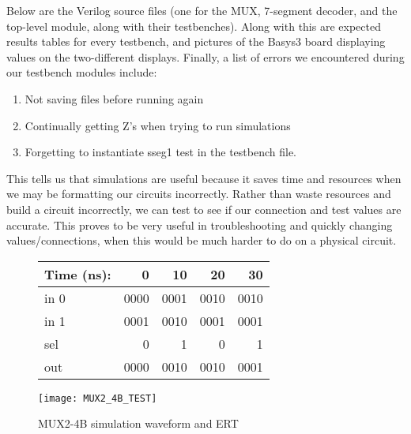 \documentclass[11pt]{article}
\begin{document}
Below are the Verilog source files (one for the MUX, 7-segment decoder, and the top-level module, along with their testbenches). Along with this are expected results tables for every testbench, and pictures of the Basys3 board displaying values on the two-different displays. Finally, a list of errors we encountered during our testbench modules include:

\begin{enumerate}
	
	\item Not saving files before running again
	
	
	
	\item Continually getting Z's when trying to run simulations
	
	
	
	\item Forgetting to instantiate sseg1 test in the testbench file.
	
	
	
\end{enumerate} 

This tells us that simulations are useful because it saves time and resources when we may be formatting our circuits incorrectly. Rather than waste resources and build a circuit incorrectly, we can test to see if our connection and test values are accurate. This proves to be very useful in troubleshooting and quickly changing values/connections, when this would be much harder to do on a physical circuit.



\begin{figure}[ht]\centering
	\begin{tabular}{l|rrrr}
		Time (ns): & 0 & 10 & 20 & 30 \\
		\midrule 
		in 0 & 0000 & 0001 & 0010 & 0010 \\
		in 1 & 0001 & 0010 & 0001 & 0001 \\
		sel & 0 & 1 & 0 & 1 \\
		\bottomrule
		out & 0000 & 0010 &0010 &0001 
	\end{tabular}\medskip
	
	\texttt{[image: MUX2\_4B\_TEST]}
	\caption{MUX2-4B simulation waveform and ERT}
	\label{fig:sim_with_table}
\end{figure}
\end{document}
